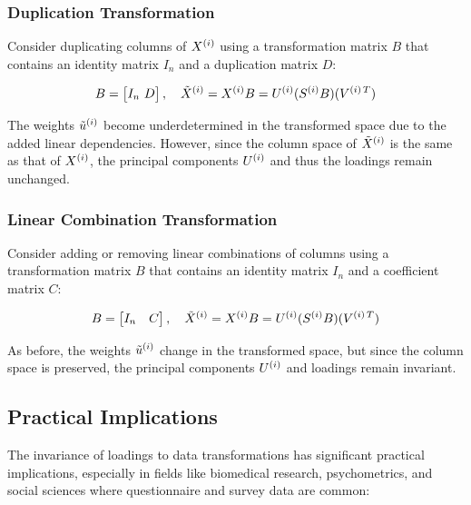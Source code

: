 \subsubsection{Duplication Transformation}
Consider duplicating columns of $X^{(i)}$ using a transformation matrix $B$ that contains an identity matrix $I_n$ and a duplication matrix $D$:

\begin{align}
B = \begin{bmatrix}
I_n \
D
\end{bmatrix}, \quad
\tilde{X}^{(i)} = X^{(i)}B = U^{(i)}(S^{(i)}B)(V^{(i)\,T}) \label{eq:duplication}
\end{align}

The weights $\tilde{u}^{(i)}$ become underdetermined in the transformed space due to the added linear dependencies. However, since the column space of $\tilde{X}^{(i)}$ is the same as that of $X^{(i)}$, the principal components $U^{(i)}$ and thus the loadings remain unchanged.

\subsubsection{Linear Combination Transformation}
Consider adding or removing linear combinations of columns using a transformation matrix $B$ that contains an identity matrix $I_n$ and a coefficient matrix $C$:

\begin{align}
B = \begin{bmatrix}
I_n & C
\end{bmatrix}, \quad
\tilde{X}^{(i)} = X^{(i)}B = U^{(i)}(S^{(i)}B)(V^{(i)\,T}) \label{eq:linear_combination}
\end{align}

As before, the weights $\tilde{u}^{(i)}$ change in the transformed space, but since the column space is preserved, the principal components $U^{(i)}$ and loadings remain invariant.

\subsection{Practical Implications}
The invariance of loadings to data transformations has significant practical implications, especially in fields like biomedical research, psychometrics, and social sciences where questionnaire and survey data are common:

